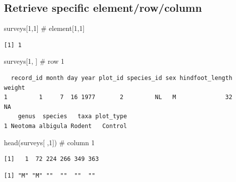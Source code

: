 \documentclass[
  letterpaper,
  DIV=11,
  numbers=noendperiod]{scrreprt}
\newenvironment{Shaded}{\begin{snugshade}}{\end{snugshade}}
\newcommand{\CommentTok}[1]{\textcolor[rgb]{0.37,0.37,0.37}{#1}}
\newcommand{\DecValTok}[1]{\textcolor[rgb]{0.68,0.00,0.00}{#1}}
\newcommand{\FunctionTok}[1]{\textcolor[rgb]{0.28,0.35,0.67}{#1}}
\newcommand{\NormalTok}[1]{\textcolor[rgb]{0.00,0.23,0.31}{#1}}
\newcommand{\SpecialCharTok}[1]{\textcolor[rgb]{0.37,0.37,0.37}{#1}}
\begin{document}
\subsection{Retrieve specific
element/row/column}\label{retrieve-specific-elementrowcolumn}

\begin{Shaded}
\begin{Highlighting}[]
\NormalTok{surveys[}\DecValTok{1}\NormalTok{,}\DecValTok{1}\NormalTok{]    }\CommentTok{\# element[1,1]}
\end{Highlighting}
\end{Shaded}

\begin{verbatim}
[1] 1
\end{verbatim}

\begin{Shaded}
\begin{Highlighting}[]
\NormalTok{surveys[}\DecValTok{1}\NormalTok{, ]    }\CommentTok{\# row 1}
\end{Highlighting}
\end{Shaded}

\begin{verbatim}
  record_id month day year plot_id species_id sex hindfoot_length weight
1         1     7  16 1977       2         NL   M              32     NA
    genus  species   taxa plot_type
1 Neotoma albigula Rodent   Control
\end{verbatim}

\begin{Shaded}
\begin{Highlighting}[]
\FunctionTok{head}\NormalTok{(surveys[ ,}\DecValTok{1}\NormalTok{])  }\CommentTok{\# column 1}
\end{Highlighting}
\end{Shaded}

\begin{verbatim}
[1]   1  72 224 266 349 363
\end{verbatim}

\begin{Shaded}
\end{Shaded}

\begin{verbatim}
[1] "M" "M" ""  ""  ""  "" 
\end{verbatim}
\end{document}
